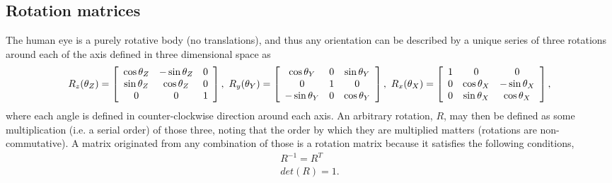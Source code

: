 \subsection{Rotation matrices}
\label{rotmatsss}
The human eye is a purely rotative body (no translations), and thus any orientation can be described by a unique series of three rotations around each of the axis defined in three dimensional space as
\begin{equation}
\label{rrr}
R _ { z } ( \theta_Z ) = \left[ \begin{array} { c c c } { \cos \theta_Z } & { - \sin \theta_Z } & { 0 } \\ { \sin \theta_Z } & { \cos \theta_Z } & { 0 } \\ { 0 } & { 0 } & { 1 } \end{array} \right], \
R _ { y } ( \theta_Y ) = \left[ \begin{array} { c c c } { \cos \theta_Y } & { 0 } & { \sin \theta_Y } \\ { 0 } & { 1 } & { 0 } \\ { - \sin \theta_Y } & { 0 } & { \cos \theta_Y } \end{array} \right], \
R _ { x } ( \theta_X ) = \left[ \begin{array} { c c c } { 1 } & { 0 } & { 0 } \\ { 0 } & { \cos \theta_X } & { - \sin \theta_X } \\ { 0 } & { \sin \theta_X } & { \cos \theta_X} \end{array} \right],
\end{equation}
where each angle is defined in counter-clockwise direction around each axis. An arbitrary rotation, $R$, may then be defined as some multiplication (i.e. a serial order) of those three, noting that the order by which they are multiplied matters (rotations are non-commutative). A matrix originated from any combination of those is a rotation matrix because it satisfies the following conditions,
\begin{align}
	R^{-1} = R^T\\
	det(R) = 1.
\end{align} 

